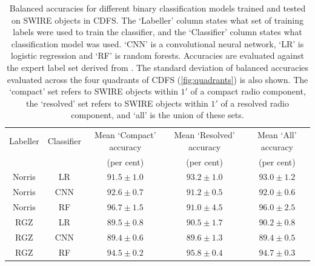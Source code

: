 \documentclass[fleqn,usenatbib,usedcolumn]{mnras}
\begin{document}
  \begin{table}
    \caption{Balanced accuracies for different binary classification models trained and tested on SWIRE objects in CDFS.
    The `Labeller' column states what set of training labels
    were used to train the classifier, and the `Classifier' column states what
    classification model was used. `CNN' is a convolutional neural network,
    `LR' is logistic regression and `RF' is random forests. Accuracies are evaluated against the expert
    label set derived from \citet{norris06}. The standard deviation of balanced accuracies evaluated across the four quadrants of
    CDFS (\autoref{fig:quadrants}) is also shown. The `compact' set refers to SWIRE
    objects within $1'$ of a compact radio component, the `resolved' set refers to
    SWIRE objects within $1'$ of a resolved radio component, and `all' is the union of these sets.}
    \label{tab:cdfs-ba}
    \begin{tabular}{ccccc}
    \hline
    Labeller & Classifier & Mean `Compact' accuracy & Mean `Resolved' accuracy & Mean `All' accuracy\\
     &  & (per cent) & (per cent) & (per cent)\\
    \hline
    Norris & LR & $91.5 \pm 1.0$ & $93.2 \pm 1.0$ & $93.0 \pm 1.2$\\
    Norris & CNN & $92.6 \pm 0.7$ & $91.2 \pm 0.5$ & $92.0 \pm 0.6$\\
    Norris & RF & $96.7 \pm 1.5$ & $91.0 \pm 4.5$ & $96.0 \pm 2.5$\\
    RGZ & LR & $89.5 \pm 0.8$ & $90.5 \pm 1.7$ & $90.2 \pm 0.8$\\
    RGZ & CNN & $89.4 \pm 0.6$ & $89.6 \pm 1.3$ & $89.4 \pm 0.5$\\
    RGZ & RF & $94.5 \pm 0.2$ & $95.8 \pm 0.4$ & $94.7 \pm 0.3$\\
    \hline
    \end{tabular}
  \end{table}
\end{document}
